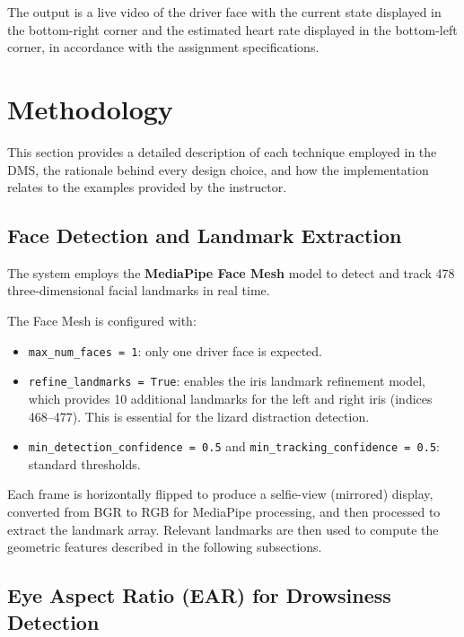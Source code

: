 \documentclass[12pt,a4paper]{article}
\begin{document}
The output is a live video of the driver face with the current state displayed in the bottom-right corner and the estimated heart rate displayed in the bottom-left corner, in accordance with the assignment specifications.

\section{Methodology}\label{sec:method}

This section provides a detailed description of each technique employed in the DMS, the rationale behind every design choice, and how the implementation relates to the examples provided by the instructor.

\subsection{Face Detection and Landmark Extraction}\label{subsec:face}

The system employs the \textbf{MediaPipe Face Mesh} model to detect and track 478 three-dimensional facial landmarks in real time. 


The Face Mesh is configured with:
\begin{itemize}[noitemsep]
    \item \texttt{max\_num\_faces = 1}: only one driver face is expected.
    \item \texttt{refine\_landmarks = True}: enables the iris landmark refinement model, which provides 10 additional landmarks for the left and right iris (indices 468--477). This is essential for the lizard distraction detection.
    \item \texttt{min\_detection\_confidence = 0.5} and \texttt{min\_tracking\_confidence = 0.5}: standard thresholds.
\end{itemize}

Each frame is horizontally flipped to produce a selfie-view (mirrored) display, converted from BGR to RGB for MediaPipe processing, and then processed to extract the landmark array. Relevant landmarks are then used to compute the geometric features described in the following subsections.

\subsection{Eye Aspect Ratio (EAR) for Drowsiness Detection}\label{subsec:ear}
\end{document}

